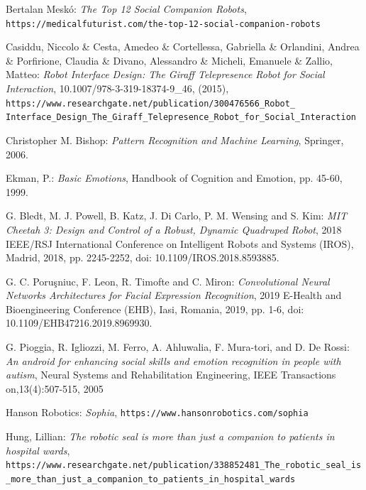 \documentclass[runningheads,a4paper,12pt]{report}
\begin{document}
\begin{thebibliography}{9}

Bertalan Mesk\'o:
\textit{The Top 12 Social Companion Robots},
\texttt{https://medicalfuturist.com/the-top-12-social-companion-robots}

Casiddu, Niccolo \& Cesta, Amedeo \& Cortellessa, Gabriella \& Orlandini, Andrea \& Porfirione, Claudia \& Divano, Alessandro \& Micheli, Emanuele \& Zallio, Matteo: 
\textit{Robot Interface Design: The Giraff Telepresence Robot for Social Interaction}, 10.1007/978-3-319-18374-9\_46, (2015),
\texttt{https://www.researchgate.net/publication/300476566\_Robot\_
Interface\_Design\_The\_Giraff\_Telepresence\_Robot\_for\_Social\_Interaction}

Christopher M. Bishop:
\textit{Pattern Recognition and Machine Learning}, 
Springer,
2006.

Ekman, P.: 
\textit{Basic Emotions}, Handbook of Cognition and Emotion, pp. 45-60, 1999.

G. Bledt, M. J. Powell, B. Katz, J. Di Carlo, P. M. Wensing and S. Kim:
\textit{MIT Cheetah 3: Design and Control of a Robust, Dynamic Quadruped Robot}, 
2018 IEEE/RSJ International Conference on Intelligent Robots and Systems (IROS), Madrid, 2018, pp. 2245-2252, doi: 10.1109/IROS.2018.8593885.

G. C. Poru\c sniuc, F. Leon, R. Timofte and C. Miron:
\textit{Convolutional Neural Networks Architectures for Facial Expression Recognition},
2019 E-Health and Bioengineering Conference (EHB), Iasi, Romania, 2019, pp. 1-6, doi: 10.1109/EHB47216.2019.8969930.

G. Pioggia, R. Igliozzi, M. Ferro, A. Ahluwalia, F. Mura-tori, and D. De Rossi:
\textit{An android for enhancing social skills and emotion recognition in people with autism},
Neural Systems and Rehabilitation Engineering, IEEE Transactions on,13(4):507-515, 2005

Hanson Robotics:
\textit{Sophia},
\texttt{https://www.hansonrobotics.com/sophia}

Hung, Lillian:
\textit{The robotic seal is more than just a companion to patients in hospital wards}, \texttt{https://www.researchgate.net/publication/338852481\_The\_robotic\_seal\_is\_more\_than\_just\_a\_companion\_to\_patients\_in\_hospital\_wards}


\end{thebibliography}
\end{document}

